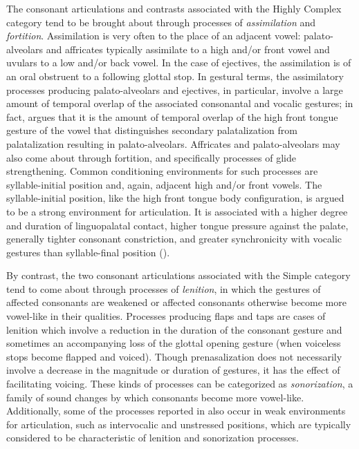   The consonant articulations and contrasts associated with the Highly Complex category tend to be brought about through processes of \textit{assimilation} and \textit{fortition}. Assimilation is very often to the place of an adjacent vowel: palato-alveolars and affricates typically assimilate to a high and/or front vowel and uvulars to a low and/or back vowel. In the case of ejectives, the assimilation is of an oral obstruent to a following glottal stop. In gestural terms, the assimilatory processes producing palato-alveolars and ejectives, in particular, involve a large amount of temporal overlap of the associated consonantal and vocalic gestures; in fact, \citet{Bateman2007} argues that it is the amount of temporal overlap of the high front tongue gesture of the vowel that distinguishes secondary palatalization from palatalization resulting in palato-alveolars. Affricates and palato-alveolars may also come about through fortition, and specifically processes of glide strengthening. Common conditioning environments for such processes are syllable-initial position and, again, adjacent high and/or front vowels. The syllable-initial position, like the high front tongue body configuration, is argued to be a strong environment for articulation. It is associated with a higher degree and duration of linguopalatal contact, higher tongue pressure against the palate, generally tighter consonant constriction, and greater synchronicity with vocalic gestures than syllable-final position (\citealt{Byrd1996b,Fougeron1999,KeatingEtAl2003,GoldsteinEtAl2006}).

  By contrast, the two consonant articulations associated with the Simple category tend to come about through processes of \textit{lenition}, in which the gestures of affected consonants are weakened or affected consonants otherwise become more vowel-like in their qualities. Processes producing flaps and taps are cases of lenition which involve a reduction in the duration of the consonant gesture and sometimes an accompanying loss of the glottal opening gesture (when voiceless stops become flapped and voiced). Though prenasalization does not necessarily involve a decrease in the magnitude or duration of gestures, it has the effect of facilitating voicing. These kinds of processes can be categorized as \textit{sonorization}, a family of sound changes by which consonants become more vowel-like. Additionally, some of the processes reported in  also occur in weak environments for articulation, such as intervocalic and unstressed positions, which are typically considered to be characteristic of lenition and sonorization processes.

